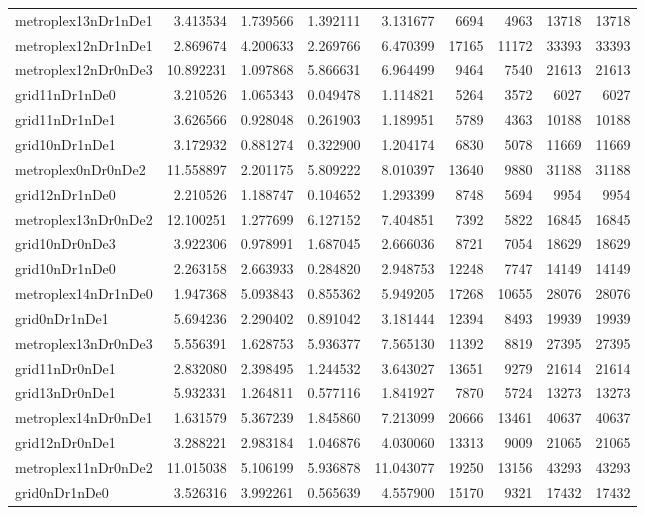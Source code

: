 \begin{longtable}{|l|r|r|r|r|r|r|r|r|}
metroplex13nDr1nDe1 & 3.413534 & 1.739566 & 1.392111 & 3.131677 & 6694 & 4963 & 13718 & 13718 \\
metroplex12nDr1nDe1 & 2.869674 & 4.200633 & 2.269766 & 6.470399 & 17165 & 11172 & 33393 & 33393 \\
metroplex12nDr0nDe3 & 10.892231 & 1.097868 & 5.866631 & 6.964499 & 9464 & 7540 & 21613 & 21613 \\
grid11nDr1nDe0 & 3.210526 & 1.065343 & 0.049478 & 1.114821 & 5264 & 3572 & 6027 & 6027 \\
grid11nDr1nDe1 & 3.626566 & 0.928048 & 0.261903 & 1.189951 & 5789 & 4363 & 10188 & 10188 \\
grid10nDr1nDe1 & 3.172932 & 0.881274 & 0.322900 & 1.204174 & 6830 & 5078 & 11669 & 11669 \\
metroplex0nDr0nDe2 & 11.558897 & 2.201175 & 5.809222 & 8.010397 & 13640 & 9880 & 31188 & 31188 \\
grid12nDr1nDe0 & 2.210526 & 1.188747 & 0.104652 & 1.293399 & 8748 & 5694 & 9954 & 9954 \\
metroplex13nDr0nDe2 & 12.100251 & 1.277699 & 6.127152 & 7.404851 & 7392 & 5822 & 16845 & 16845 \\
grid10nDr0nDe3 & 3.922306 & 0.978991 & 1.687045 & 2.666036 & 8721 & 7054 & 18629 & 18629 \\
grid10nDr1nDe0 & 2.263158 & 2.663933 & 0.284820 & 2.948753 & 12248 & 7747 & 14149 & 14149 \\
metroplex14nDr1nDe0 & 1.947368 & 5.093843 & 0.855362 & 5.949205 & 17268 & 10655 & 28076 & 28076 \\
grid0nDr1nDe1 & 5.694236 & 2.290402 & 0.891042 & 3.181444 & 12394 & 8493 & 19939 & 19939 \\
metroplex13nDr0nDe3 & 5.556391 & 1.628753 & 5.936377 & 7.565130 & 11392 & 8819 & 27395 & 27395 \\
grid11nDr0nDe1 & 2.832080 & 2.398495 & 1.244532 & 3.643027 & 13651 & 9279 & 21614 & 21614 \\
grid13nDr0nDe1 & 5.932331 & 1.264811 & 0.577116 & 1.841927 & 7870 & 5724 & 13273 & 13273 \\
metroplex14nDr0nDe1 & 1.631579 & 5.367239 & 1.845860 & 7.213099 & 20666 & 13461 & 40637 & 40637 \\
grid12nDr0nDe1 & 3.288221 & 2.983184 & 1.046876 & 4.030060 & 13313 & 9009 & 21065 & 21065 \\
metroplex11nDr0nDe2 & 11.015038 & 5.106199 & 5.936878 & 11.043077 & 19250 & 13156 & 43293 & 43293 \\
grid0nDr1nDe0 & 3.526316 & 3.992261 & 0.565639 & 4.557900 & 15170 & 9321 & 17432 & 17432 \\

\end{longtable}
